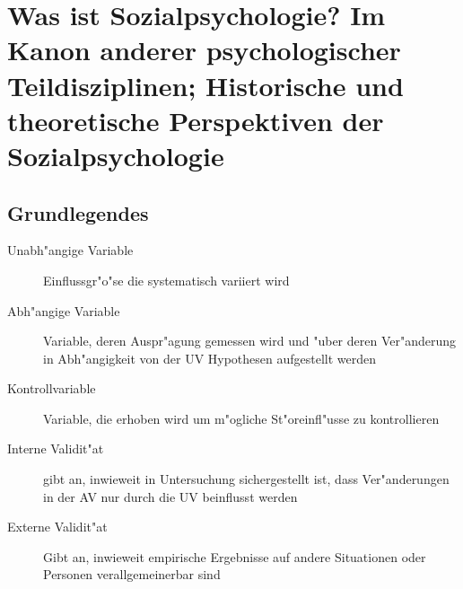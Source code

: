 
\section{Was ist Sozialpsychologie? Im Kanon anderer psychologischer Teildisziplinen; Historische und theoretische Perspektiven der Sozialpsychologie}
\subsection{Grundlegendes}
\begin{description}
	\item[Unabh"angige Variable] Einflussgr"o"se die systematisch variiert wird
	\item[Abh"angige Variable]
		Variable, deren Auspr"agung gemessen wird und "uber deren Ver"anderung in Abh"angigkeit von der UV Hypothesen aufgestellt werden
	\item[Kontrollvariable]
		Variable, die erhoben wird um m"ogliche St"oreinfl"usse zu kontrollieren
	\item[Interne Validit"at]
		gibt an, inwieweit in Untersuchung sichergestellt ist, dass Ver"anderungen in der AV nur durch die UV beinflusst werden
	\item[Externe Validit"at]
		Gibt an, inwieweit empirische Ergebnisse auf andere Situationen oder Personen verallgemeinerbar sind
\end{description}
